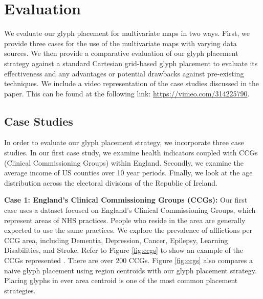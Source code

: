 \section{Evaluation} \label{sec:video}
We evaluate our glyph placement for multivariate maps in two ways. First, we provide three cases for the use of the multivariate maps with varying data sources. We then provide a comparative evaluation of our glyph placement strategy against a standard Cartesian grid-based glyph placement to evaluate its effectiveness and any advantages or potential drawbacks against pre-existing techniques. We include a video representation of the case studies discussed in the paper. This can be found at the following link: \url{https://vimeo.com/314225790}.

\subsection{Case Studies}  \label{sec:case}
In order to evaluate our glyph placement strategy, we incorporate three case studies. In our first case study, we examine health indicators coupled with CCGs (Clinical Commissioning Groups) within England. Secondly, we examine the average income of US counties over 10 year periods. Finally, we look at the age distribution across the electoral divisions of the Republic of Ireland.


\textbf{Case 1: England's Clinical Commissioning Groups (CCGs): } \label{sec:case01}
Our first case uses a dataset focused on England's Clinical Commissioning Groups, which represent areas of NHS practices. People who reside in the area are generally expected to use the same practices. We explore the prevalence of afflictions per CCG area, including Dementia, Depression, Cancer, Epilepsy, Learning Disabilities, and Stroke. Refer to Figure \ref{fig:ccgs} to show an example of the CCGs represented \cite{publicHealthEngland}. There are over 200 CCGs. Figure \ref{fig:ccgs} also compares a naive glyph placement using region centroids with our glyph placement strategy. Placing glyphs in ever area centroid is one of the most common placement strategies.

